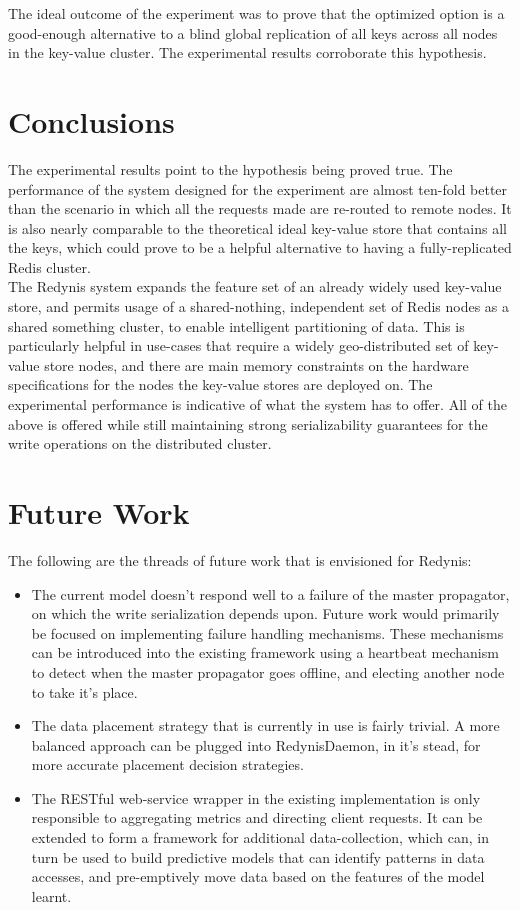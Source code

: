 \documentclass{sig-alternate}
\begin{document}
The ideal outcome of the experiment was to prove that the optimized option is a good-enough alternative to a blind global replication of all keys across all nodes in the key-value cluster. The experimental results corroborate this hypothesis.\\


\section{Conclusions}
The experimental results point to the hypothesis being proved true. The performance of the system designed for the experiment are almost ten-fold better than the scenario in which all the requests made are re-routed to remote nodes. It is also nearly comparable to the theoretical ideal key-value store that contains all the keys, which could prove to be a helpful alternative to having a fully-replicated Redis cluster.\\

The Redynis system expands the feature set of an already widely used key-value store, and permits usage of a shared-nothing, independent set of Redis nodes as a shared something cluster, to enable intelligent partitioning of data. This is particularly helpful in use-cases that require a widely geo-distributed set of key-value store nodes, and there are main memory constraints on the hardware specifications for the nodes the key-value stores are deployed on. The experimental performance is indicative of what the system has to offer. All of the above is offered while still maintaining strong serializability guarantees for the write operations on the distributed cluster.\\


\section{Future Work}
The following are the threads of future work that is envisioned for Redynis:

\begin{itemize}
	\item The current model doesn't respond well to a failure of the master propagator, on which the write serialization depends upon. Future work would primarily be focused on implementing failure handling mechanisms. These mechanisms can be introduced into the existing framework using a heartbeat mechanism to detect when the master propagator goes offline, and electing another node to take it's place.
	\item The data placement strategy that is currently in use is fairly trivial. A more balanced approach can be plugged into RedynisDaemon, in it's stead, for more accurate placement decision strategies.
	\item The RESTful web-service wrapper in the existing implementation is only responsible to aggregating metrics and directing client requests. It can be extended to form a framework for additional data-collection, which can, in turn be used to build predictive models that can identify patterns in data accesses, and pre-emptively move data based on the features of the model learnt.\\
\end{itemize}
\end{document}
